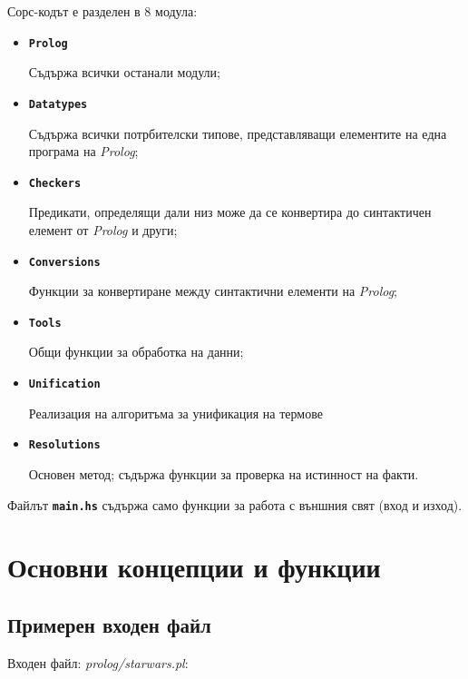 \documentclass[15pt]{extarticle}
\begin{document}
	Сорс-кодът е разделен в 8 модула:
	\begin{itemize}
		
		\item \textbf{\texttt{Prolog}}
		
		Съдържа всички останали модули;
		
		\item \textbf{\texttt{Datatypes}}
		
		Съдържа всички потрбителски типове, представляващи елементите на една програма на \emph{Prolog};
		
		\item \textbf{\texttt{Checkers}}
		
		Предикати, определящи дали низ може да се конвертира до синтактичен елемент от \emph{Prolog} и други;
		
		\item \textbf{\texttt{Conversions}}
		
		Функции за конвертиране между синтактични елементи на \emph{Prolog};
		
		\item \textbf{\texttt{Tools}}
		
		Общи функции за обработка на данни;
		
		\item \textbf{\texttt{Unification}}
		
		Реализация на алгоритъма за унификация на термове
		
		\item \textbf{\texttt{Resolutions}}
		
		Основен метод; съдържа функции за проверка на истинност на факти.
		
	\end{itemize}

	Файлът \textbf{\texttt{main.hs}} съдържа само функции за работа с външния свят (вход и изход).
	
	\section{Основни концепции и функции}
	
	\subsection{Примерен входен файл}
	
	Входен файл: \emph{prolog/starwars.pl}:
	
\end{document}
